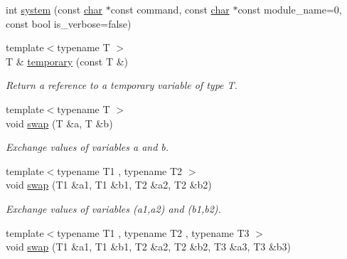 \begin{DoxyCompactItemize}
int \hyperlink{namespacecimg__library__suffixed_1_1cimg_a5ddfa532b09b12973f543977f1f688da}{system} (const \hyperlink{classchar}{char} $\ast$const command, const \hyperlink{classchar}{char} $\ast$const module\+\_\+name=0, const bool is\+\_\+verbose=false)
\item 
\mbox{\label{namespacecimg__library__suffixed_1_1cimg_af931f5a4ed9addcbb7a7d27abd7670e5}} 
{\footnotesize template$<$typename T $>$ }\\T \& \hyperlink{namespacecimg__library__suffixed_1_1cimg_af931f5a4ed9addcbb7a7d27abd7670e5}{temporary} (const T \&)
\begin{DoxyCompactList}\small\item\em Return a reference to a temporary variable of type T. \end{DoxyCompactList}\item 
\mbox{\label{namespacecimg__library__suffixed_1_1cimg_a337eb7828c4ba8532f16e55d0c1468d6}} 
{\footnotesize template$<$typename T $>$ }\\void \hyperlink{namespacecimg__library__suffixed_1_1cimg_a337eb7828c4ba8532f16e55d0c1468d6}{swap} (T \&a, T \&b)
\begin{DoxyCompactList}\small\item\em Exchange values of variables {\ttfamily a} and {\ttfamily b}. \end{DoxyCompactList}\item 
\mbox{\label{namespacecimg__library__suffixed_1_1cimg_aa4d77ad5aa3b88a07257c583a1b5d475}} 
{\footnotesize template$<$typename T1 , typename T2 $>$ }\\void \hyperlink{namespacecimg__library__suffixed_1_1cimg_aa4d77ad5aa3b88a07257c583a1b5d475}{swap} (T1 \&a1, T1 \&b1, T2 \&a2, T2 \&b2)
\begin{DoxyCompactList}\small\item\em Exchange values of variables ({\ttfamily a1},{\ttfamily a2}) and ({\ttfamily b1},{\ttfamily b2}). \end{DoxyCompactList}\item 
\mbox{\label{namespacecimg__library__suffixed_1_1cimg_a8e3fcd4b409a2dbd6e61492e2314ed54}} 
{\footnotesize template$<$typename T1 , typename T2 , typename T3 $>$ }\\void \hyperlink{namespacecimg__library__suffixed_1_1cimg_a8e3fcd4b409a2dbd6e61492e2314ed54}{swap} (T1 \&a1, T1 \&b1, T2 \&a2, T2 \&b2, T3 \&a3, T3 \&b3)

\end{DoxyCompactItemize}
